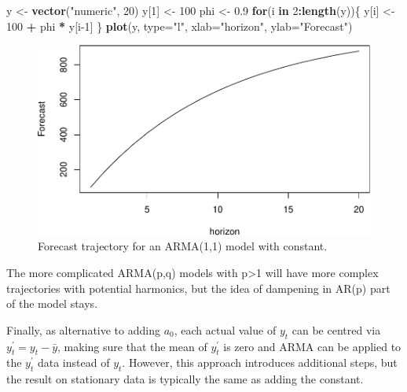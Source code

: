 \documentclass[]{book}
\newenvironment{Shaded}{\begin{snugshade}}{\end{snugshade}}
\newcommand{\ControlFlowTok}[1]{\textcolor[rgb]{0.13,0.29,0.53}{\textbf{#1}}}
\newcommand{\DataTypeTok}[1]{\textcolor[rgb]{0.13,0.29,0.53}{#1}}
\newcommand{\DecValTok}[1]{\textcolor[rgb]{0.00,0.00,0.81}{#1}}
\newcommand{\FloatTok}[1]{\textcolor[rgb]{0.00,0.00,0.81}{#1}}
\newcommand{\KeywordTok}[1]{\textcolor[rgb]{0.13,0.29,0.53}{\textbf{#1}}}
\newcommand{\NormalTok}[1]{#1}
\newcommand{\OperatorTok}[1]{\textcolor[rgb]{0.81,0.36,0.00}{\textbf{#1}}}
\newcommand{\StringTok}[1]{\textcolor[rgb]{0.31,0.60,0.02}{#1}}
\theoremstyle{definition}
\theoremstyle{definition}
\theoremstyle{definition}
\theoremstyle{definition}
\theoremstyle{remark}
\begin{document}
\begin{Shaded}
\begin{Highlighting}[]
\NormalTok{y <-}\StringTok{ }\KeywordTok{vector}\NormalTok{(}\StringTok{"numeric"}\NormalTok{, }\DecValTok{20}\NormalTok{)}
\NormalTok{y[}\DecValTok{1}\NormalTok{] <-}\StringTok{ }\DecValTok{100}
\NormalTok{phi <-}\StringTok{ }\FloatTok{0.9}
\ControlFlowTok{for}\NormalTok{(i }\ControlFlowTok{in} \DecValTok{2}\OperatorTok{:}\KeywordTok{length}\NormalTok{(y))\{}
\NormalTok{    y[i] <-}\StringTok{ }\DecValTok{100} \OperatorTok{+}\StringTok{ }\NormalTok{phi }\OperatorTok{*}\StringTok{ }\NormalTok{y[i}\DecValTok{-1}\NormalTok{]}
\NormalTok{\}}
\KeywordTok{plot}\NormalTok{(y, }\DataTypeTok{type=}\StringTok{"l"}\NormalTok{, }\DataTypeTok{xlab=}\StringTok{"horizon"}\NormalTok{, }\DataTypeTok{ylab=}\StringTok{"Forecast"}\NormalTok{)}
\end{Highlighting}
\end{Shaded}

\begin{figure}
\centering
\includegraphics{Svetunkov--2022----ADAM_files/figure-latex/ARMAConstantTrajectory-1.pdf}
\caption{\label{fig:ARMAConstantTrajectory}Forecast trajectory for an ARMA(1,1) model with constant.}
\end{figure}

The more complicated ARMA(p,q) models with p\textgreater{}1 will have more complex trajectories with potential harmonics, but the idea of dampening in AR(p) part of the model stays.

Finally, as alternative to adding \(a_0\), each actual value of \(y_t\) can be centred via \(y^\prime_t = y_t -\bar{y}\), making sure that the mean of \(y^\prime_t\) is zero and ARMA can be applied to the \(y^\prime_t\) data instead of \(y_t\). However, this approach introduces additional steps, but the result on stationary data is typically the same as adding the constant.
\end{document}
